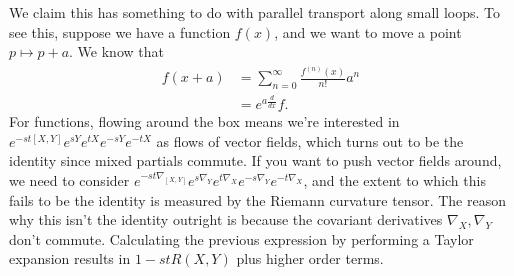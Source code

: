 We claim this has something to do with parallel transport along small loops. To see this, suppose we have a function $f(x)$, and we want to move a point $p \mapsto p+a$. We know that 
\begin{align*}
    f(x+a)&=\sum_{n=0}^{\infty} \frac{f^{(n)}(x)}{n!}a^n \\
          &= e^{a \frac{d}{d x}}f.
\end{align*}For functions, flowing around the box means we're interested in $e^{-st[X,Y]}e^{sY}e^{tX}e^{-sY}e^{-tX}$ as flows of vector fields, which turns out to be the identity since mixed partials commute. If you want to push vector fields around, we need to consider $e^{-st\nabla_{[X,Y]}}e^{s\nabla_Y}e^{t\nabla_X}e^{-s\nabla_Y}e^{-t\nabla_X}$, and the extent to which this fails to be the identity is measured by the Riemann curvature tensor. The reason why this isn't the identity outright is because the covariant derivatives $\nabla_X,\nabla_Y$ don't commute. Calculating the previous expression by performing a Taylor expansion results in $1-st R(X,Y)$ plus higher order terms.

